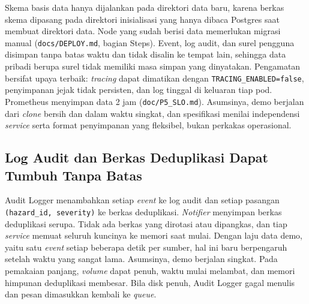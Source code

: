 Skema basis data hanya dijalankan pada direktori data baru, karena berkas skema dipasang pada direktori inisialisasi yang hanya dibaca Postgres saat membuat direktori data. Node yang sudah berisi data memerlukan migrasi manual (\texttt{docs/DEPLOY.md}, bagian Steps). Event, log audit, dan surel pengguna disimpan tanpa batas waktu dan tidak disalin ke tempat lain, sehingga data pribadi berupa surel tidak memiliki masa simpan yang dinyatakan. Pengamatan bersifat upaya terbaik: \textit{tracing} dapat dimatikan dengan \texttt{TRACING\_ENABLED=false}, penyimpanan jejak tidak persisten, dan log tinggal di keluaran tiap pod. Prometheus menyimpan data 2 jam (\texttt{doc/P5\_SLO.md}). Asumsinya, demo berjalan dari \textit{clone} bersih dan dalam waktu singkat, dan spesifikasi menilai independensi \textit{service} serta format penyimpanan yang fleksibel, bukan perkakas operasional.

\subsection{Log Audit dan Berkas Deduplikasi Dapat Tumbuh Tanpa Batas}

Audit Logger menambahkan setiap \textit{event} ke log audit dan setiap pasangan \texttt{(hazard\_id, severity)} ke berkas deduplikasi. \textit{Notifier} menyimpan berkas deduplikasi serupa. Tidak ada berkas yang dirotasi atau dipangkas, dan tiap \textit{service} memuat seluruh kuncinya ke memori saat mulai. Dengan laju data demo, yaitu satu \textit{event} setiap beberapa detik per sumber, hal ini baru berpengaruh setelah waktu yang sangat lama. Asumsinya, demo berjalan singkat. Pada pemakaian panjang, \textit{volume} dapat penuh, waktu mulai melambat, dan memori himpunan deduplikasi membesar. Bila disk penuh, Audit Logger gagal menulis dan pesan dimasukkan kembali ke \textit{queue}.
